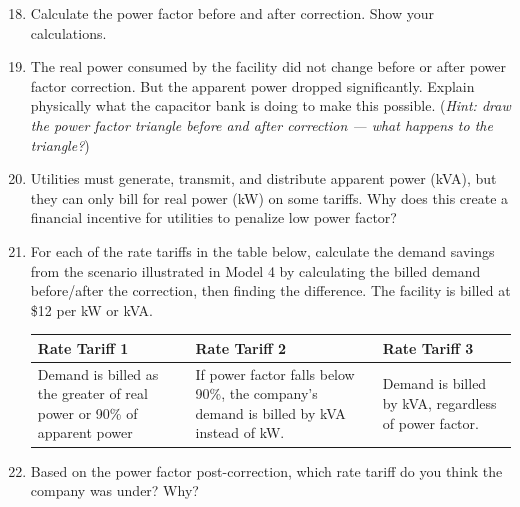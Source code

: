 \documentclass[./main.tex]{subfiles}
\begin{document}
\begin{enumerate}
  \setcounter{enumi}{17}
  \item Calculate the power factor before and after correction. Show your
        calculations.
        \vspace{1.25in}

  \item The real power consumed by the facility did not change before or after
        power factor correction. But the apparent power dropped significantly.
        Explain physically what the capacitor bank is doing to make this
        possible. (\emph{Hint: draw the power factor triangle before and after
        correction --- what happens to the triangle?})
        \vspace{1.25in}

  \item Utilities must generate, transmit, and distribute apparent power
        (kVA), but they can only bill for real power (kW) on some tariffs.
        Why does this create a financial incentive for utilities to penalize
        low power factor?
        \vspace{1.25in}

  \item For each of the rate tariffs in the table below, calculate the demand
        savings from the scenario illustrated in Model 4 by calculating the
        billed demand before/after the correction, then finding the difference.
        The facility is billed at \$12 per kW or kVA.

        \begin{longtable}[]{@{}
          >{\raggedright\arraybackslash}p{}
          >{\raggedright\arraybackslash}p{}
          >{\raggedright\arraybackslash}p{}@{}}
        \toprule\noalign{}
        Rate Tariff 1 & Rate Tariff 2 & Rate Tariff 3 \\
        \midrule\noalign{}
        \endhead
        \bottomrule\noalign{}
        \endlastfoot
        Demand is billed as the greater of real power or 90\% of apparent power
        & If power factor falls below 90\%, the company's demand is billed by kVA
          instead of kW.
        & Demand is billed by kVA, regardless of power factor. \\
        \end{longtable}
        \vspace{1.25in}

  \item Based on the power factor post-correction, which rate tariff do you
        think the company was under? Why?
        \vspace{1.25in}
\end{enumerate}
\end{document}
